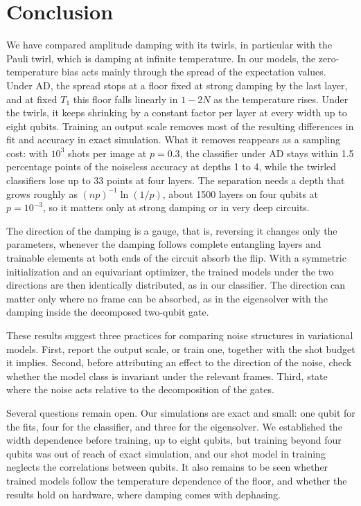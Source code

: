 \documentclass[
 aps,pra,
 twocolumn,
 superscriptaddress,
 longbibliography,
 nofootinbib
]{revtex4-2}
\begin{document}
\section{Conclusion}
\label{sec:conclusion}

We have compared amplitude damping with its twirls, in particular with the
Pauli twirl, which is damping at infinite temperature. In our models, the
zero-temperature bias acts mainly through the spread of the expectation values.
Under AD, the spread stops at a floor fixed at strong damping by the last layer,
and at fixed $T_1$ this floor falls linearly in $1-2N$ as the temperature
rises. Under the twirls, it keeps shrinking by a constant factor per layer at
every width up to eight qubits. Training an output scale removes most of the
resulting differences in fit and accuracy in exact simulation. What it removes reappears as a sampling cost: with $10^3$ shots per
image at $p=0.3$, the classifier under AD stays within 1.5 percentage points of
the noiseless accuracy at depths 1 to 4, while the twirled classifiers lose up
to 33 points at four layers. The separation needs a depth that grows roughly
as $(np)^{-1}\ln(1/p)$, about 1500 layers on four qubits at $p=10^{-3}$, so it
matters only at strong damping or in very deep circuits.

The direction of the damping is a gauge, that is, reversing it changes only
the parameters, whenever the damping follows complete entangling layers and
trainable elements at both ends of the circuit absorb the flip. With a symmetric initialization and an
equivariant optimizer, the trained models under the two directions are then
identically distributed, as in our classifier. The direction can matter only
where no frame can be absorbed, as in the eigensolver with the damping inside
the decomposed two-qubit gate.

These results suggest three practices for comparing noise structures in
variational models. First, report the output scale, or train one, together
with the shot budget it implies. Second, before attributing an effect to the
direction of the noise, check whether the model class is invariant under the
relevant frames. Third, state where the noise acts relative to the
decomposition of the gates.

Several questions remain open. Our simulations are exact and small: one qubit
for the fits, four for the classifier, and three for the eigensolver. We
established the width dependence before training, up to eight qubits, but
training beyond four qubits was out of reach of exact simulation, and our shot
model in training neglects the correlations between qubits. It also remains
to be seen whether trained models follow the temperature dependence of the
floor, and whether the results hold on hardware, where damping comes with
dephasing.
\end{document}
